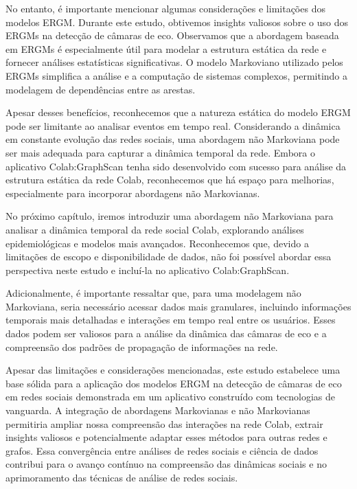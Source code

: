 No entanto, é importante mencionar algumas considerações e limitações dos modelos ERGM. Durante este estudo, obtivemos insights valiosos sobre o uso dos ERGMs na detecção de câmaras de eco. Observamos que a abordagem baseada em ERGMs é especialmente útil para modelar a estrutura estática da rede e fornecer análises estatísticas significativas. O modelo Markoviano utilizado pelos ERGMs simplifica a análise e a computação de sistemas complexos, permitindo a modelagem de dependências entre as arestas.

Apesar desses benefícios, reconhecemos que a natureza estática do modelo ERGM pode ser limitante ao analisar eventos em tempo real. Considerando a dinâmica em constante evolução das redes sociais, uma abordagem não Markoviana pode ser mais adequada para capturar a dinâmica temporal da rede. Embora o aplicativo Colab:GraphScan tenha sido desenvolvido com sucesso para análise da estrutura estática da rede Colab, reconhecemos que há espaço para melhorias, especialmente para incorporar abordagens não Markovianas.

No próximo capítulo, iremos introduzir uma abordagem não Markoviana para analisar a dinâmica temporal da rede social Colab, explorando análises epidemiológicas e modelos mais avançados. Reconhecemos que, devido a limitações de escopo e disponibilidade de dados, não foi possível abordar essa perspectiva neste estudo e incluí-la no aplicativo Colab:GraphScan.

Adicionalmente, é importante ressaltar que, para uma modelagem não Markoviana, seria necessário acessar dados mais granulares, incluindo informações temporais mais detalhadas e interações em tempo real entre os usuários. Esses dados podem ser valiosos para a análise da dinâmica das câmaras de eco e a compreensão dos padrões de propagação de informações na rede.

Apesar das limitações e considerações mencionadas, este estudo estabelece uma base sólida para a aplicação dos modelos ERGM na detecção de câmaras de eco em redes sociais demonstrada em um aplicativo construído com tecnologias de vanguarda. A integração de abordagens Markovianas e não Markovianas permitiria ampliar nossa compreensão das interações na rede Colab, extrair insights valiosos e potencialmente adaptar esses métodos para outras redes e grafos. Essa convergência entre análises de redes sociais e ciência de dados contribui para o avanço contínuo na compreensão das dinâmicas sociais e no aprimoramento das técnicas de análise de redes sociais.